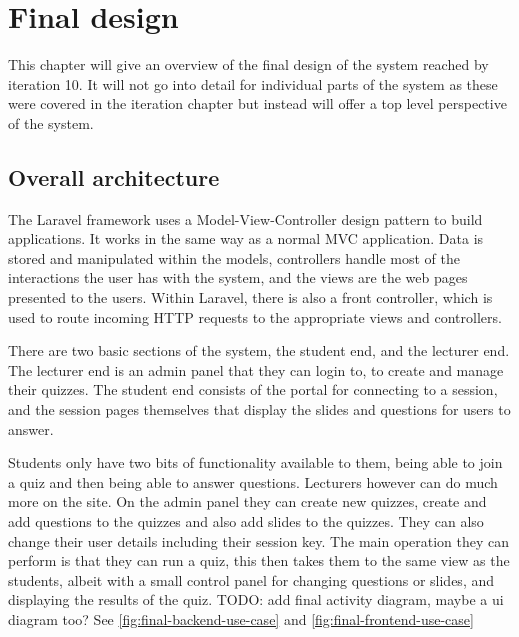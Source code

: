 \chapter{Final design}
This chapter will give an overview of the final design of the system reached by iteration 10. It will not go into detail for individual parts of the system as these were covered in the iteration chapter but instead will offer a top level perspective of the system.

\section{Overall architecture}
The Laravel framework uses a Model-View-Controller design pattern to build applications. It works in the same way as a normal MVC application. Data is stored and manipulated within the models, controllers handle most of the interactions the user has with the system, and the views are the web pages presented to the users. Within Laravel, there is also a front controller, which is used to route incoming HTTP requests to the appropriate views and controllers\cite{Laravel-architechture}.

There are two basic sections of the system, the student end, and the lecturer end. The lecturer end is an admin panel that they can login to, to create and manage their quizzes. The student end consists of the portal for connecting to a session, and the session pages themselves that display the slides and questions for users to answer.

Students only have two bits of functionality available to  them, being able to join a quiz and then being able to answer questions. Lecturers however can do much more on the site. On the admin panel they can create new quizzes, create and add questions to the quizzes and also add slides to the quizzes. They can also change their user details including their session key. The main operation they can perform is that they can run a quiz, this then takes them to the same view as the students, albeit with a small control panel for changing questions or slides, and displaying the results of the quiz. TODO: add final activity diagram, maybe a ui diagram too? See \ref{fig:final-backend-use-case} and \ref{fig:final-frontend-use-case}

